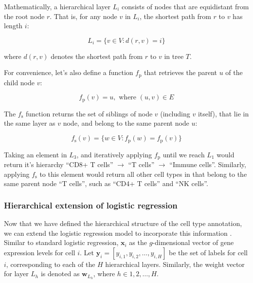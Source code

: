 Mathematically, a hierarchical layer $L_i$ consists of nodes that are equidistant from the root node $r$. That is, for any node $v$ in $L_i$, the shortest path from $r$ to $v$ has length $i$:

\begin{equation}
    L_i = \{v \in V : d(r, v) = i\}
\end{equation}

where $d(r,v)$ denotes the shortest path from $r$ to $v$ in tree $T$. 

For convenience, let's also define a function $f_{\text{p}}$  that retrieves the parent $u$ of the child node $v$:

\begin{equation}
    f_{\text{p}}(v) = u, \text{ where } (u, v) \in E
\end{equation}

The $f_{\text{s}}$ function  returns the set of siblings of node $v$ (including $v$ itself), that lie in the same layer as $v$ node, and belong to the same parent node $u$:

\begin{equation}
    f_{\text{s}}(v) = \{w \in V : f_{\text{p}}(w) = f_{\text{p}}(v)\}
\end{equation}

Taking an element in $L_3$, and iteratively applying $f_{\text{p}}$ until we reach $L_1$  would return it's hierarchy ``CD8+ T cells'' $\rightarrow$ ``T cells'' $\rightarrow$ ``Immune cells''. Similarly, applying $f_{\text{s}}$ to this element would return all other cell types in that belong to the same parent node ``T cells'', such as ``CD4+ T cells'' and ``NK cells''.

\subsubsection*{Hierarchical extension of logistic regression}

Now that we have defined the hierarchical structure of the cell type annotation, we can extend the logistic regression model to incorporate this information . Similar to standard logistic regression, $\mathbf{x}_i$ as the $g$-dimensional vector of gene expression levels for cell $i$. Let $\mathbf{y}_i = [y_{i,1}, y_{i,2}, \ldots, y_{i,H}]$ be the set of labels for cell $i$, corresponding to each of the $H$ hierarchical layers. Similarly, the weight vector for layer $L_h$ is denoted as $\mathbf{w}_{L_h}$, where $h \in {1, 2, \ldots, H}$.

